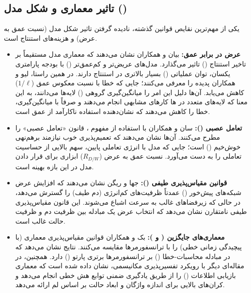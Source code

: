 \subsection{تاثیر معماری و شکل مدل ()}
یکی از مهم‌ترین نقایص قوانین گذشته، نادیده گرفتن تاثیر شکل مدل (نسبت عمق به عرض) و هزینه‌های استنتاج است.

\begin{itemize}
    \item \textbf{عرض در برابر عمق:} بیان و همکاران \cite{bian2025scaling} نشان می‌دهند که معماری مدل مستقیماً بر تاخیر استنتاج () تاثیر می‌گذارد. مدل‌های عریض‌تر و کم‌عمق‌تر () با بودجه پارامتری یکسان، توان عملياتی () بسیار بالاتری در استنتاج دارند. در همین راستا، لیو و همکاران \cite{liu2026inverse} پدیده  را معرفی می‌کنند؛ جایی که خطا با نسبت معکوس عمق ($1/\ell$) کاهش می‌یابد. آن‌ها دلیل این امر را میانگین‌گیری گروهی () لایه‌ها می‌دانند، به این معنا که لایه‌های متعدد در ها کارهای مشابهی انجام می‌دهند و صرفاً با میانگین‌گیری، خطا را کاهش می‌دهند که نشان‌دهنده استفاده ناکارآمد از عمق است.
    
    \item \textbf{تعامل عصبی ():} سان و همکاران \cite{sun2026law} با استفاده از مفهوم ، قانون «تعامل عصبی» را مطرح می‌کنند. آن‌ها نشان می‌دهند که تعمیم‌پذیری خوب نیازمند برهم‌نهی خوش‌خیم () است؛ جایی که مدل با انرژی تعاملی پایین، سهم بالایی از حساسیت تعاملی را به دست می‌آورد. نسبت عمق به عرض ($R_{D/W}$) ابزاری برای قرار دادن مدل در این بازه بهینه است.
    
    \item \textbf{قوانین مقیاس‌پذیری طیفی ():} جها و ریگن \cite{jha2025spectral} نشان می‌دهند که افزایش عرض شبکه‌های پیش‌خور () عمدتاً ظرفیت‌های کم‌انرژی (دم طیف) را گسترش می‌دهد، در حالی که زیرفضاهای غالب به سرعت اشباع می‌شوند. این قانون مقیاس‌پذیری طیفی نامتقارن نشان می‌دهد که انتخاب عرض  یک مبادله بین ظرفیت دم و ظرفیت حالت غالب است.
    
    \item \textbf{معماری‌های جایگزین ( و ):} بک و همکاران \cite{beck2026xlstm} قوانین مقیاس‌پذیری معماری  (با پیچیدگی زمانی خطی) را با ترانسفورمرها مقایسه می‌کنند. نتایج نشان می‌دهد که  در مبادله محاسبات-خطا () بر ترانسفورمرها برتری پارتو () دارد. همچنین، در مقاله‌ای دیگر \cite{anonymous2026recall} با رویکرد تفسیرپذیری مکانیسمی، نشان داده شده است که معماری  بازیابی اطلاعات () را از طریق یادگیری ضمنی توابع هش خطی انجام می‌دهد و کران‌های بالایی برای اندازه واژگان و ابعاد حالت بر اساس لم  ارائه می‌دهد.
\end{itemize}

